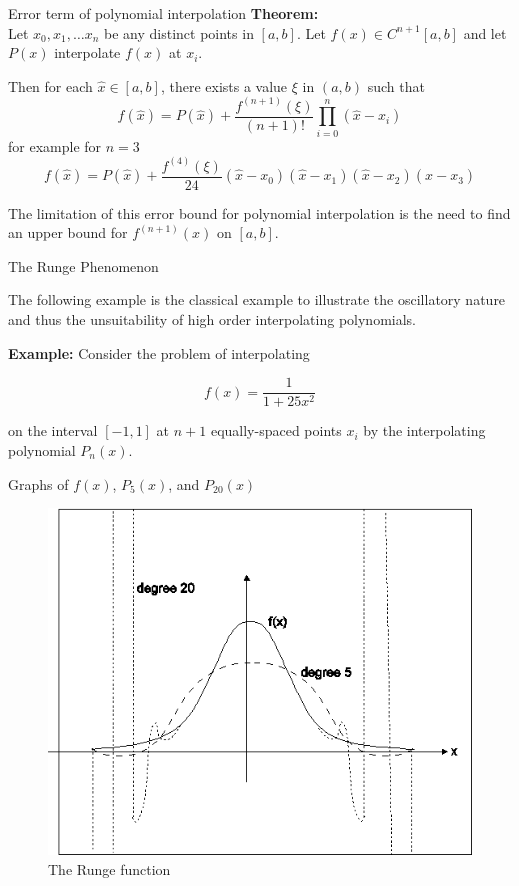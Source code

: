 \documentclass[12pt]{beamer}
\begin{document}
\begin{frame}{Error term of polynomial interpolation} 
\noindent 
{\bf Theorem:} \\ 
Let $x_0, x_1, \dots x_n$ be any distinct points in $[a,b]$. Let $f(x) \in C^{n+1} [a,b]$ and let 
$P(x)$ interpolate $f(x)$ at ${x_i}$. 

Then for each $\hat x \in [a,b]$, there exists a value $\xi$ in $(a,b)$ such that 
\[
f(\hat x) = P(\hat x) + \frac{f^{(n+1)}(\xi)}{(n+1)!} \prod_{i=0}^{n} (\hat x - x_i)
\]
for example for $n=3$ 
\[
f(\hat x) = P(\hat x) + \frac{f^{(4)}(\xi)}{24} (\hat x - x_0)(\hat x - x_1)(\hat x - x_2)(\hat x - x_3)
\]

\noindent 
The limitation of this error bound for polynomial interpolation is the need to find an upper bound for 
$f^{(n+1)}(x)$ on $[a,b]$. 
\end{frame} 

\begin{frame}{The Runge Phenomenon}

The following example is the classical example to illustrate the oscillatory nature and thus the unsuitability of high order interpolating polynomials.

{\bf Example:} Consider the problem of interpolating

\[
f(x)= \frac{1}{1+25x^2}
\]

\noindent
on the interval $[-1,1]$ at $n+1$ equally-spaced points $x_i$ by the interpolating polynomial $P_n(x)$.

\end{frame}

\begin{frame}{Graphs of $f(x)$, $P_5(x)$, and $P_{20}(x)$}
\begin{figure} 
  \centering
  \includegraphics[scale=0.6]{runge}
  \caption{The Runge function}
  \label{fig:runge}
\end{figure}


\end{frame} 
\end{document}

